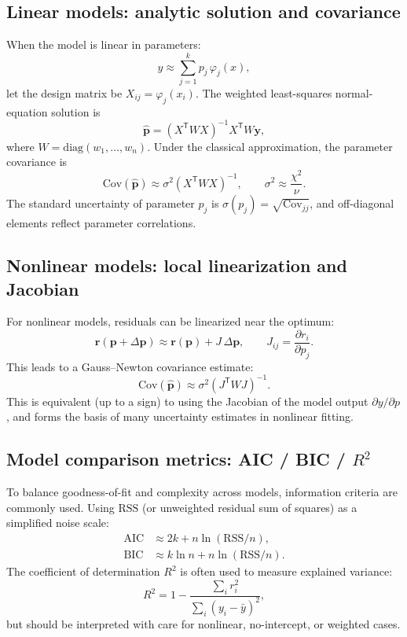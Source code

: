 \documentclass[a4paper,11pt]{article}
\begin{document}
\subsection{Linear models: analytic solution and covariance}

When the model is linear in parameters:
\begin{equation}
y \approx \sum_{j=1}^{k} p_j\,\varphi_j(x),
\end{equation}
let the design matrix be $X_{ij}=\varphi_j(x_i)$. The weighted least-squares normal-equation solution is
\begin{equation}
\hat{\bm{p}}=(X^\mathsf{T}WX)^{-1}X^\mathsf{T}W\bm{y},
\end{equation}
where $W=\mathrm{diag}(w_1,\ldots,w_n)$. Under the classical approximation, the parameter covariance is
\begin{equation}
\mathrm{Cov}(\hat{\bm{p}})\approx \sigma^2 (X^\mathsf{T}WX)^{-1},\qquad
\sigma^2\approx \frac{\chi^2}{\nu}.
\end{equation}
The standard uncertainty of parameter $p_j$ is $\sigma(p_j)=\sqrt{\mathrm{Cov}_{jj}}$, and off-diagonal elements reflect parameter correlations.

\subsection{Nonlinear models: local linearization and Jacobian}

For nonlinear models, residuals can be linearized near the optimum:
\begin{equation}
\bm{r}(\bm{p}+\Delta\bm{p})\approx \bm{r}(\bm{p}) + J\,\Delta\bm{p},\qquad
J_{ij}=\frac{\partial r_i}{\partial p_j}.
\end{equation}
This leads to a Gauss--Newton covariance estimate:
\begin{equation}
\mathrm{Cov}(\hat{\bm{p}})\approx \sigma^2 (J^\mathsf{T}WJ)^{-1}.
\end{equation}
This is equivalent (up to a sign) to using the Jacobian of the model output $\partial y/\partial p$, and forms the basis of many uncertainty estimates in nonlinear fitting.

\subsection{Model comparison metrics: AIC / BIC / $R^2$}

To balance goodness-of-fit and complexity across models, information criteria are commonly used. Using $\mathrm{RSS}$ (or unweighted residual sum of squares) as a simplified noise scale:
\begin{align}
\mathrm{AIC} &\approx 2k + n\ln(\mathrm{RSS}/n),\\
\mathrm{BIC} &\approx k\ln n + n\ln(\mathrm{RSS}/n).
\end{align}
The coefficient of determination $R^2$ is often used to measure explained variance:
\begin{equation}
R^2 = 1-\frac{\sum_i r_i^2}{\sum_i (y_i-\bar{y})^2},
\end{equation}
but should be interpreted with care for nonlinear, no-intercept, or weighted cases.
\end{document}
